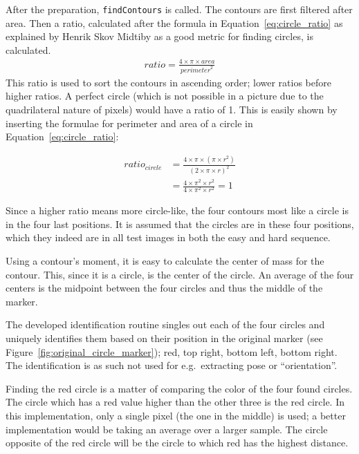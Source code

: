 After the preparation, \verb|findContours| is called.
The contours are first filtered after area.
Then a ratio, calculated after the formula in Equation~\vref{eq:circle_ratio} as explained by Henrik Skov Midtiby as a good metric for finding circles, is calculated.
\begin{align}\label{eq:circle_ratio}
    \mathit{ratio} = \frac{4\times\pi\times\mathit{area}}{\mathit{perimeter}^2}
\end{align}
This ratio is used to sort the contours in ascending order; lower ratios before higher ratios.
A perfect circle (which is not possible in a picture due to the quadrilateral nature of pixels) would have a ratio of 1.
This is easily shown by inserting the formulae for perimeter and area of a circle in Equation~\ref{eq:circle_ratio}:

\begin{align}
    \mathit{ratio}_\mathit{circle}  &= \frac{4\times\pi\times\left(\pi\times r^2\right)}{\left(2\times\pi\times r\right)^2}\nonumber \\
                                    &= \frac{4\times\pi^2\times r^2}{4\times\pi^2\times r^2} = 1
\end{align}

Since a higher ratio means more circle-like, the four contours most like a circle is in the four last positions.
It is assumed that the circles are in these four positions, which they indeed are in all test images in both the easy and hard sequence.

Using a contour's moment, it is easy to calculate the center of mass for the contour.
This, since it is a circle, is the center of the circle.
An average of the four centers is the midpoint between the four circles and thus the middle of the marker.

The developed identification routine singles out each of the four circles and uniquely identifies them based on their position in the original marker (see Figure~\vref{fig:original_circle_marker}); red, top right, bottom left, bottom right.
The identification is as such not used for e.g.\ extracting pose or ``orientation''.

Finding the red circle is a matter of comparing the color of the four found circles.
The circle which has a red value higher than the other three is the red circle.
In this implementation, only a single pixel (the one in the middle) is used; a better implementation would be taking an average over a larger sample.
The circle opposite of the red circle will be the circle to which red has the highest distance.

